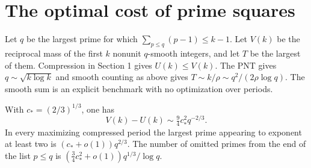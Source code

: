 \section{The optimal cost of prime squares}
Let $q$ be the largest prime for which $\sum_{p\le q}(p-1)\le k-1$. Let $V(k)$ be the reciprocal mass of the first $k$ nonunit $q$-smooth integers, and let $T$ be the largest of them. Compression in Section 1 gives $U(k)\le V(k)$. The PNT gives $q\sim\sqrt{k\log k}$ and smooth counting as above gives $T\sim k/\rho\sim q^2/(2\rho\log q)$. The smooth sum is an explicit benchmark with no optimization over periods.
\begin{theorem}
With $c_*=(2/3)^{1/3}$, one has
\[
 V(k)-U(k)\sim \tfrac94 c_*^2 q^{-2/3}.
\]
In every maximizing compressed period the largest prime appearing to exponent at least two is $(c_*+o(1))q^{2/3}$. The number of omitted primes from the end of the list $p\le q$ is $(\tfrac34 c_*^2+o(1))q^{1/3}/\log q$.
\end{theorem}
